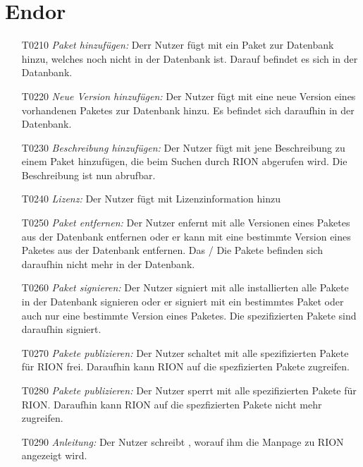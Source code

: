\section{Endor}

\begin{itemize}
	\item[T0210] \textit{Paket hinzufügen:} Derr Nutzer fügt mit  ein Paket zur Datenbank hinzu, welches noch nicht in der Datenbank ist. Darauf befindet es sich in der Datanbank.
	\item[T0220] \textit{Neue Version hinzufügen:} Der Nutzer fügt mit  eine neue Version eines vorhandenen Paketes zur Datenbank hinzu. Es befindet sich daraufhin in der Datenbank.
	\item[T0230] \textit{Beschreibung hinzufügen:} Der Nutzer fügt mit  jene Beschreibung zu einem Paket hinzufügen, die beim Suchen durch RION abgerufen wird. Die Beschreibung ist nun abrufbar.
	\item[T0240] \textit{Lizenz:} Der Nutzer fügt mit  Lizenzinformation hinzu
	\item[T0250] \textit{Paket entfernen:} Der Nutzer enfernt mit  alle Versionen eines Paketes aus der Datenbank entfernen oder er kann mit  eine bestimmte Version eines Paketes aus der Datenbank entfernen. Das / Die Pakete befinden sich daraufhin nicht mehr in der Datenbank.
	\item[T0260] \textit{Paket signieren:} Der Nutzer signiert mit  alle installierten alle Pakete in der Datenbank signieren oder er signiert mit  ein bestimmtes Paket oder auch nur eine bestimmte Version eines Paketes. Die spezifizierten Pakete sind daraufhin signiert.
	\item[T0270] \textit{Pakete publizieren:} Der Nutzer schaltet mit  alle spezifizierten Pakete für RION frei. Daraufhin kann RION auf die spezfizierten Pakete zugreifen.
	\item[T0280] \textit{Pakete publizieren:} Der Nutzer sperrt mit  alle spezifizierten Pakete für RION. Daraufhin kann RION auf die spezfizierten Pakete nicht mehr zugreifen.
	\item[T0290] \textit{Anleitung:} Der Nutzer schreibt , worauf ihm die Manpage zu RION angezeigt wird.
\end{itemize}
